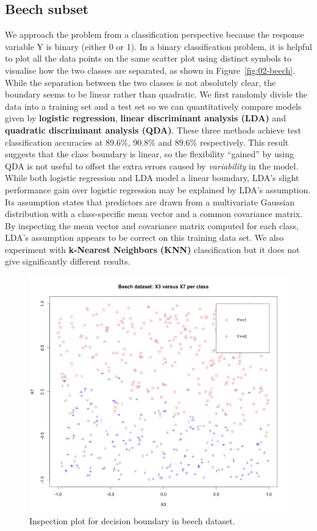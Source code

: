 \documentclass{article}
\begin{document}
\subsection{Beech subset}

We approach the problem from a classification perspective because the response variable Y is binary (either 0 or 1). In a binary classification problem, it is helpful to plot all the data points on the same scatter plot using distinct symbols to visualise how the two classes are separated, as shown in Figure~\ref{fig:02-beech}. While the separation between the two classes is not absolutely clear, the boundary seems to be linear rather than quadratic. We first randomly divide the data into a training set and a test set so we can quantitatively compare models given by  \textbf{logistic regression},  \textbf{linear discriminant analysis (LDA)} and  \textbf{quadratic discriminant analysis (QDA)}. These three methods achieve test classification accuracies at 89.6\%, 90.8\% and 89.6\% respectively. This result suggests that the class boundary is linear, so the flexibility ``gained'' by using QDA is not useful to offset the extra errors caused by {\em variability} in the model. While both logistic regression and LDA model a linear boundary, LDA's slight performance gain over logistic regression may be explained by LDA's assumption. Its assumption states that predictors are drawn from a multivariate Gaussian distribution with a class-specific mean vector and a common covariance matrix. By inspecting the mean vector and covariance matrix computed for each class, LDA's assumption appears to be correct on this training data set. We also experiment with \textbf{k-Nearest Neighbors (KNN)} classification but it does not give significantly different results.

\begin{figure}[h!]
  \includegraphics[width=\linewidth]{project/images/02-beech.png}
  \caption{Inspection plot for decision boundary in beech dataset.}
  \label{fig:01-beech}
\end{figure}
\end{document}
